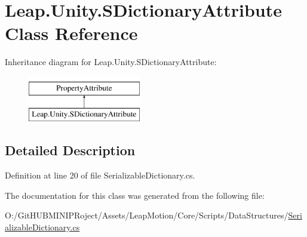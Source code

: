 \hypertarget{class_leap_1_1_unity_1_1_s_dictionary_attribute}{}\section{Leap.\+Unity.\+S\+Dictionary\+Attribute Class Reference}
\label{class_leap_1_1_unity_1_1_s_dictionary_attribute}
Inheritance diagram for Leap.\+Unity.\+S\+Dictionary\+Attribute\+:\begin{figure}[H]
\begin{center}
\leavevmode
\includegraphics[height=2.000000cm]{class_leap_1_1_unity_1_1_s_dictionary_attribute}
\end{center}
\end{figure}


\subsection{Detailed Description}


Definition at line 20 of file Serializable\+Dictionary.\+cs.



The documentation for this class was generated from the following file\+:\begin{DoxyCompactItemize}
\item 
O\+:/\+Git\+H\+U\+B\+M\+I\+N\+I\+P\+Roject/\+Assets/\+Leap\+Motion/\+Core/\+Scripts/\+Data\+Structures/\mbox{\hyperlink{_serializable_dictionary_8cs}{Serializable\+Dictionary.\+cs}}\end{DoxyCompactItemize}
